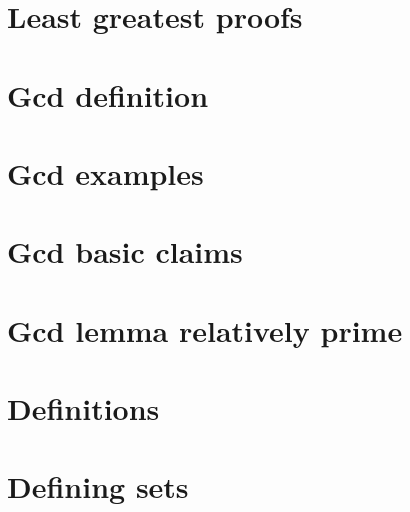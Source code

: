 
\section*{Least greatest proofs}

\vfill
\section*{Gcd definition}

\vfill
\section*{Gcd examples}

\vfill
\section*{Gcd basic claims}

\vfill
\section*{Gcd lemma relatively prime}

\vfill
\section*{Definitions}

\vfill
\section*{Defining sets}

\vfill
